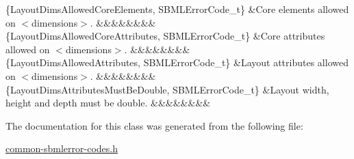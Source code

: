 \begin{DoxyParagraph}{}
\begin{longtabu}
\{Layout\+Dims\+Allowed\+Core\+Elements, S\+B\+M\+L\+Error\+Code\+\_\+t\} &Core elements allowed on {\ttfamily $<$dimensions$>$}. &&&&&&&&\\
\{Layout\+Dims\+Allowed\+Core\+Attributes, S\+B\+M\+L\+Error\+Code\+\_\+t\} &Core attributes allowed on {\ttfamily $<$dimensions$>$}. &&&&&&&&\\
\{Layout\+Dims\+Allowed\+Attributes, S\+B\+M\+L\+Error\+Code\+\_\+t\} &Layout attributes allowed on {\ttfamily $<$dimensions$>$}. &&&&&&&&\\
\{Layout\+Dims\+Attributes\+Must\+Be\+Double, S\+B\+M\+L\+Error\+Code\+\_\+t\} &Layout \textquotesingle{}width\textquotesingle{}, \textquotesingle{}height\textquotesingle{} and \textquotesingle{}depth\textquotesingle{} must be double. &&&&&&&&\\
\end{longtabu}

\end{DoxyParagraph}


The documentation for this class was generated from the following file\+:\begin{DoxyCompactItemize}
\item 
\hyperlink{common-sbmlerror-codes_8h}{common-\/sbmlerror-\/codes.\+h}\end{DoxyCompactItemize}
